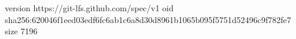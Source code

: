version https://git-lfs.github.com/spec/v1
oid sha256:620046f1eed03edf6fc6ab1c6a8d30d8961b1065b095f5751d52496c9f782fe7
size 7196
